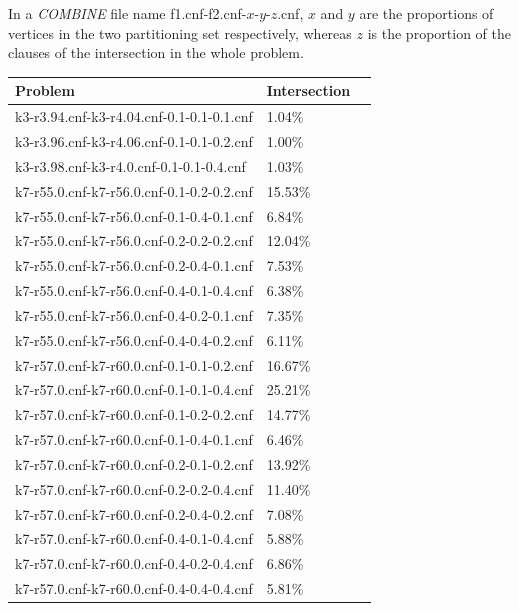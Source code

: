 \documentclass[12pt,a4paper,twoside]{scrartcl}
\numberwithin{equation}{section}
\begin{document}
In a \emph{COMBINE} file name f1.cnf-f2.cnf-$x$-$y$-$z$.cnf, $x$ and $y$ are the proportions of vertices in the two partitioning set respectively, whereas $z$ is the proportion of the clauses of the intersection in the whole problem.
\begin{table}[H]
\label{tab:combine big} 
\begin{center}
    \begin{tabular}{|l|l|p{1cm}|}
\hline 
Problem &Intersection \\ \hline
k3-r3.94.cnf-k3-r4.04.cnf-0.1-0.1-0.1.cnf&	1.04\%\\  \hline
k3-r3.96.cnf-k3-r4.06.cnf-0.1-0.1-0.2.cnf&	1.00\%\\  \hline
k3-r3.98.cnf-k3-r4.0.cnf-0.1-0.1-0.4.cnf&	1.03\%\\  \hline
k7-r55.0.cnf-k7-r56.0.cnf-0.1-0.2-0.2.cnf&	15.53\%\\  \hline
k7-r55.0.cnf-k7-r56.0.cnf-0.1-0.4-0.1.cnf&	6.84\%\\  \hline
k7-r55.0.cnf-k7-r56.0.cnf-0.2-0.2-0.2.cnf&	12.04\%\\  \hline
k7-r55.0.cnf-k7-r56.0.cnf-0.2-0.4-0.1.cnf&	7.53\%\\  \hline
k7-r55.0.cnf-k7-r56.0.cnf-0.4-0.1-0.4.cnf&	6.38\%\\  \hline
k7-r55.0.cnf-k7-r56.0.cnf-0.4-0.2-0.1.cnf&	7.35\%\\  \hline
k7-r55.0.cnf-k7-r56.0.cnf-0.4-0.4-0.2.cnf&	6.11\%\\  \hline
k7-r57.0.cnf-k7-r60.0.cnf-0.1-0.1-0.2.cnf&	16.67\%\\  \hline
k7-r57.0.cnf-k7-r60.0.cnf-0.1-0.1-0.4.cnf&	25.21\%\\  \hline
k7-r57.0.cnf-k7-r60.0.cnf-0.1-0.2-0.2.cnf&	14.77\%\\  \hline
k7-r57.0.cnf-k7-r60.0.cnf-0.1-0.4-0.1.cnf&	6.46\%\\  \hline
k7-r57.0.cnf-k7-r60.0.cnf-0.2-0.1-0.2.cnf&	13.92\%\\  \hline
k7-r57.0.cnf-k7-r60.0.cnf-0.2-0.2-0.4.cnf&	11.40\%\\  \hline
k7-r57.0.cnf-k7-r60.0.cnf-0.2-0.4-0.2.cnf&	7.08\%\\  \hline
k7-r57.0.cnf-k7-r60.0.cnf-0.4-0.1-0.4.cnf&	5.88\%\\  \hline
k7-r57.0.cnf-k7-r60.0.cnf-0.4-0.2-0.4.cnf&	6.86\%\\  \hline
k7-r57.0.cnf-k7-r60.0.cnf-0.4-0.4-0.4.cnf&	5.81\%\\  \hline

\end{tabular}
\end{center}
\end{table}
\end{document}
